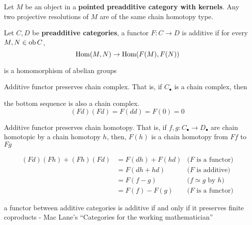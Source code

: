 \documentclass{article}
\begin{document}
\begin{corollary}
    Let $M$ be an object in a \textbf{pointed preadditive category with kernels}. Any two projective resolutions of $M$ are of the same chain homotopy type.
\end{corollary}

\begin{definition}
    Let $C, D$ be \textbf{preadditive categories}, a functor $F: C \to D$ is additive if for every $M, N \in \operatorname{ob} C$,
    $$
        \operatorname{Hom}(M, N) \to \operatorname{Hom}(F(M), F(N))
    $$
    
    is a homomorphism of abelian groups
\end{definition}

\begin{remark}
    Additive functor preserves chain complex. That is, if $C_\bullet$ is a chain complex, then
    \begin{center}
    \end{center}

    the bottom sequence is also a chain complex.
    $$
        (Fd)(Fd) = F(dd) = F(0) = 0
    $$
\end{remark}

\begin{remark}
    Additive functor preserves chain homotopy. That is, if $f, g: C_\bullet \to D_\bullet$ are chain homotopic by a chain homotopy $h$, then, $F(h)$ is a chain homotopy from $Ff$ to $Fg$

    \begin{align*}
        (Fd) (Fh) + (Fh) (Fd)
        &= F(dh) + F(hd) &\text{($F$ is a functor)} \\
        &= F(dh + hd) &\text{($F$ is additive)} \\
        &= F(f - g) &\text{($f \simeq g$ by $h$)} \\
        &= F(f) - F(g) &\text{($F$ is a functor)}
    \end{align*}

\end{remark}

\begin{remark}
    a functor between additive categories is additive if and only if it preserves finite coproducts
    - Mac Lane's “Categories for the working mathematician”
\end{remark}
\end{document}
